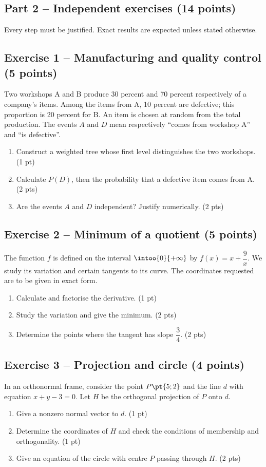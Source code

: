 \mxnewpage\subsection*{Part 2 -- Independent exercises (14 points)}
Every step must be justified. Exact results are expected unless stated otherwise.
\subsection*{Exercise 1 -- Manufacturing and quality control (5 points)}
Two workshops A and B produce 30 percent and 70 percent respectively of a company's items. Among the items from A, 10 percent are defective; this proportion is 20 percent for B. An item is chosen at random from the total production. The events $A$ and $D$ mean respectively ``comes from workshop A'' and ``is defective''.
\begin{enumerate}
\item Construct a weighted tree whose first level distinguishes the two workshops. \hfill(1 pt)
\item Calculate $P(D)$, then the probability that a defective item comes from A. \hfill(2 pts)
\item Are the events $A$ and $D$ independent? Justify numerically. \hfill(2 pts)
\end{enumerate}
\subsection*{Exercise 2 -- Minimum of a quotient (5 points)}
The function $f$ is defined on the interval $\intoo{0}{+\infty}$ by $f(x)=x+\dfrac9x$. We study its variation and certain tangents to its curve. The coordinates requested are to be given in exact form.
\begin{enumerate}
\item Calculate and factorise the derivative. \hfill(1 pt)
\item Study the variation and give the minimum. \hfill(2 pts)
\item Determine the points where the tangent has slope $\dfrac{3}{4}$. \hfill(2 pts)
\end{enumerate}
\subsection*{Exercise 3 -- Projection and circle (4 points)}
In an orthonormal frame, consider the point $P\pt{5;2}$ and the line $d$ with equation $x+y-3=0$. Let $H$ be the orthogonal projection of $P$ onto $d$.
\begin{enumerate}
\item Give a nonzero normal vector to $d$. \hfill(1 pt)
\item Determine the coordinates of $H$ and check the conditions of membership and orthogonality. \hfill(1 pt)
\item Give an equation of the circle with centre $P$ passing through $H$. \hfill(2 pts)
\end{enumerate}
